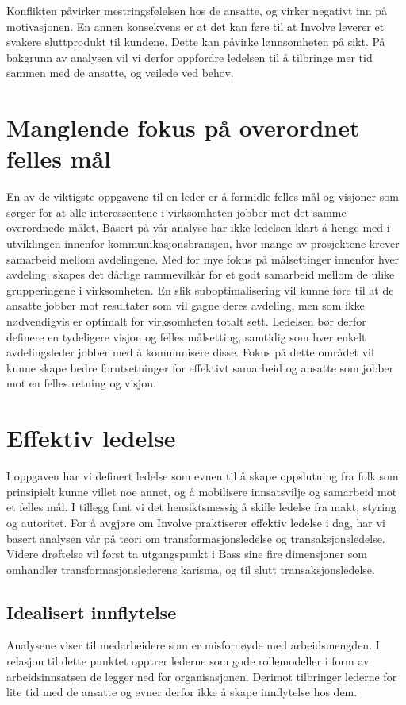 \indent \newline
Konflikten påvirker mestringsfølelsen hos de ansatte, og virker negativt inn på motivasjonen. En annen konsekvens er at det kan føre til at Involve leverer et svakere sluttprodukt til kundene. Dette kan påvirke lønnsomheten på sikt. På bakgrunn av analysen vil vi derfor oppfordre ledelsen til å tilbringe mer tid sammen med de ansatte, og veilede ved behov. 

\section{Manglende fokus på overordnet felles mål}
En av de viktigste oppgavene til en leder er å formidle felles mål og visjoner som sørger for at alle interessentene i virksomheten jobber mot det samme overordnede målet. Basert på vår analyse har ikke ledelsen klart å henge med i utviklingen innenfor kommunikasjonsbransjen, hvor mange av prosjektene krever samarbeid mellom avdelingene. Med for mye fokus på målsettinger innenfor hver avdeling, skapes det dårlige rammevilkår for et godt samarbeid mellom de ulike grupperingene i virksomheten. En slik suboptimalisering vil kunne føre til at de ansatte jobber mot resultater som vil gagne deres avdeling, men som ikke nødvendigvis er optimalt for virksomheten totalt sett. Ledelsen bør derfor definere en tydeligere visjon og felles målsetting, samtidig som hver enkelt avdelingsleder jobber med å kommunisere disse. Fokus på dette området vil kunne skape bedre forutsetninger for effektivt samarbeid og ansatte som jobber mot en felles retning og visjon. 

\section{Effektiv ledelse}
I oppgaven har vi definert ledelse som evnen til å skape oppslutning fra folk som prinsipielt kunne villet noe annet, og å mobilisere innsatsvilje og samarbeid mot et felles mål. I tillegg fant vi det hensiktsmessig å skille ledelse fra makt, styring og autoritet. For å avgjøre om Involve praktiserer effektiv ledelse i dag, har vi basert analysen vår på teori om transformasjonsledelse og transaksjonsledelse. Videre drøftelse vil først ta utgangspunkt i Bass sine fire dimensjoner som omhandler transformasjonslederens karisma, og til slutt transaksjonsledelse.

\subsection{Idealisert innflytelse}
Analysene viser til medarbeidere som er misfornøyde med arbeidsmengden. I relasjon til dette punktet opptrer lederne som gode rollemodeller i form av arbeidsinnsatsen de legger ned for organisasjonen. Derimot tilbringer lederne for lite tid med de ansatte og evner derfor ikke å skape innflytelse hos dem.

